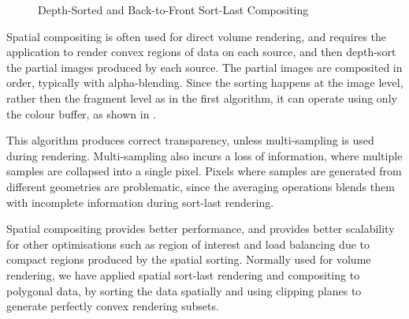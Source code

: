 \begin{figure}[h!t]\center
  \hfil
  \caption{Depth-Sorted and Back-to-Front Sort-Last Compositing}
\end{figure}

Spatial compositing is often used for direct volume rendering, and requires the
application to render convex regions of data on each source, and then depth-sort
the partial images produced by each source. The partial images are composited in
order, typically with alpha-blending. Since the sorting happens at the image
level, rather then the fragment level as in the first algorithm, it can operate
using only the colour buffer, as shown in .

This algorithm produces correct transparency, unless multi-sampling is used
during rendering. Multi-sampling also incurs a loss of information, where
multiple samples are collapsed into a single pixel. Pixels where samples are
generated from different geometries are problematic, since the averaging
operations blends them with incomplete information during sort-last rendering.

Spatial compositing provides better performance, and provides better
scalability for other optimisations such as region of interest and load
balancing due to compact regions produced by the spatial sorting. Normally used
for volume rendering, we have applied spatial sort-last rendering and
compositing to polygonal data, by sorting the data spatially and using clipping
planes to generate perfectly convex rendering subsets.

